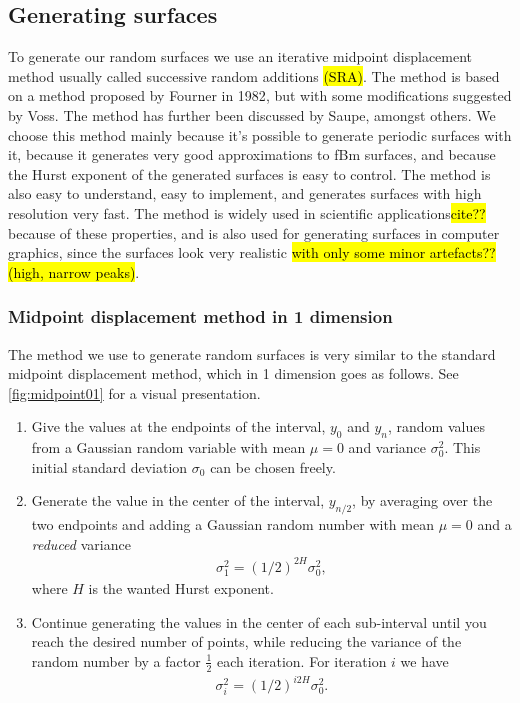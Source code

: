 \subsection{Generating surfaces}

To generate our random surfaces we use an iterative midpoint displacement method usually called successive random additions \hl{(SRA)}. The method is based on a method proposed by Fourner in 1982\cite{fournier1982computer}, but with some modifications suggested by Voss\cite{voss1985random, voss1988fractals}. The method has further been discussed by Saupe\cite{saupe1988algorithms}, amongst others. We choose this method mainly because it's possible to generate periodic surfaces with it, because it generates very good approximations to fBm surfaces\cite{zhou2005comparison}, and because the Hurst exponent of the generated surfaces is easy to control. The method is also easy to understand, easy to implement, and generates surfaces with high resolution very fast. The method is widely used in scientific applications\hl{cite??} because of these properties, and is also used for generating surfaces in computer graphics, since the surfaces look very realistic \hl{with only some minor artefacts?? (high, narrow peaks)}.

\subsubsection{Midpoint displacement method in 1 dimension}
The method we use to generate random surfaces is very similar to the standard midpoint displacement method, which in 1 dimension goes as follows. See \cref{fig:midpoint01} for a visual presentation.
\begin{enumerate}
    \item Give the values at the endpoints of the interval, $y_0$ and $y_n$, random values from a Gaussian random variable with mean $\mu = 0$ and variance $\sigma_0^2$. This initial standard deviation $\sigma_0$ can be chosen freely.
    \item Generate the value in the center of the interval, $y_{n/2}$, by averaging over the two endpoints and adding a Gaussian random number with mean $\mu = 0$ and a \emph{reduced} variance
    \begin{align}
         \sigma_1^2 = \left(1/2\right)^{2H}\sigma_0^2, \label{eq:midpoint_sigma_first}
    \end{align}
    where $H$ is the wanted Hurst exponent.
    \item Continue generating the values in the center of each sub-interval until you reach the desired number of points, while reducing the variance of the random number by a factor $\frac{1}{2}$ each iteration. For iteration $i$ we have
    \begin{align}
        \sigma_i^2 = \left(1/2\right)^{i2H}\sigma_0^2. \label{eq:midpoint_sigma_general}
    \end{align}
\end{enumerate}

